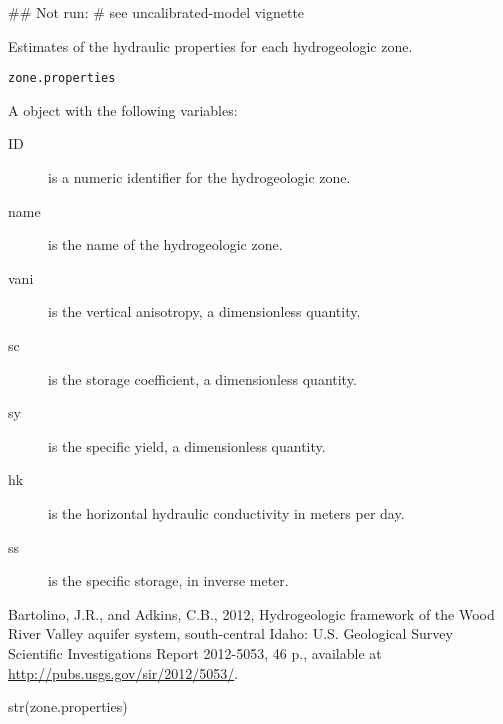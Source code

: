\documentclass[a4paper]{book}
\begin{document}
%
\begin{Examples}
\begin{ExampleCode}
## Not run: # see uncalibrated-model vignette
\end{ExampleCode}
\end{Examples}
%
\begin{Description}\relax
Estimates of the hydraulic properties for each hydrogeologic zone.
\end{Description}
%
\begin{Usage}
\begin{verbatim}
zone.properties
\end{verbatim}
\end{Usage}
%
\begin{Format}
A  object with the following variables:
\begin{description}

\item[ID] is a numeric identifier for the hydrogeologic zone.
\item[name] is the name of the hydrogeologic zone.
\item[vani] is the vertical anisotropy, a dimensionless quantity.
\item[sc] is the storage coefficient, a dimensionless quantity.
\item[sy] is the specific yield, a dimensionless quantity.
\item[hk] is the horizontal hydraulic conductivity in meters per day.
\item[ss] is the specific storage, in inverse meter.

\end{description}

\end{Format}
%
\begin{Source}\relax
Bartolino, J.R., and Adkins, C.B., 2012, Hydrogeologic framework of the Wood River Valley aquifer system, south-central Idaho: U.S. Geological Survey Scientific Investigations Report 2012-5053, 46 p., available at \url{http://pubs.usgs.gov/sir/2012/5053/}.
\end{Source}
%
\begin{Examples}
\begin{ExampleCode}
str(zone.properties)
\end{ExampleCode}
\end{Examples}
\printindex{}
\end{document}
